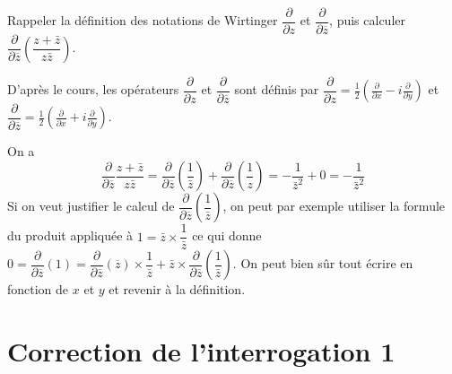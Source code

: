 \begin{exo}
Rappeler la définition des notations de Wirtinger $\dfrac{\partial}{\partial z}$ et $\dfrac{\partial}{\partial \overline z}$, puis calculer $\dfrac{\partial}{\partial \overline z}\left(\dfrac{z+\bar z}{z\bar z}\right)$.
\begin{sol}
D'après le cours, les opérateurs $\dfrac{\partial}{\partial z}$ et $\dfrac{\partial}{\partial \overline z}$ sont définis par 
$\dfrac{\partial}{\partial z} = \frac12 \left(\frac{\partial}{\partial x}-i\frac{\partial}{\partial y}\right)$ et$\dfrac{\partial}{\partial \overline z} = \frac12 \left(\frac{\partial}{\partial x}+i\frac{\partial}{\partial y}\right)$.

On a  
\[ 
\dfrac{\partial}{\partial \overline z}\dfrac{z+\bar z}{z\bar z}
=\dfrac{\partial}{\partial \overline z}\left(\dfrac{1}{\bar z}\right)+\dfrac{\partial}{\partial \overline z}\left(\dfrac{1}{z}\right)
= -\dfrac{1}{\bar z^2}+0 
=-\dfrac{1}{\bar z^2} \]
Si on veut justifier le calcul de $\dfrac{\partial}{\partial \overline z}\left(\dfrac{1}{\bar z}\right)$, on peut par exemple utiliser la formule du produit appliquée à $1=\bar z \times \dfrac{1}{\bar z}$ ce qui donne $0 = \dfrac{\partial}{\partial \overline z} (1) = \dfrac{\partial}{\partial \overline z} (\overline z) \times \dfrac{1}{\bar z} + \bar z \times \dfrac{\partial}{\partial \overline z} \left(\dfrac{1}{\bar z}\right)$. On peut bien sûr tout écrire en fonction de $x$ et $y$ et revenir à la définition.
\end{sol}
\end{exo}







\newpage
\section*{Correction de l'interrogation 1}



